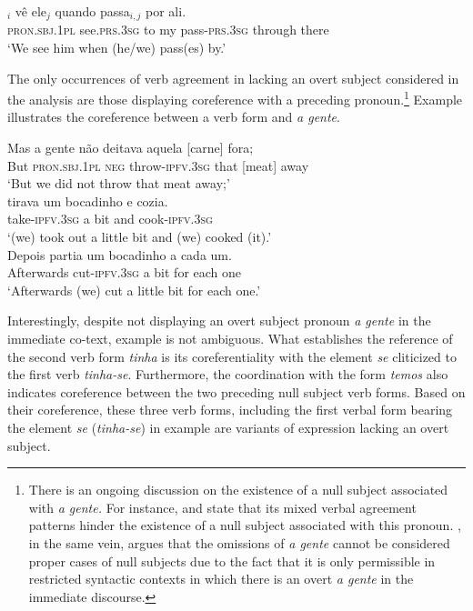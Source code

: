 \documentclass[output=paper]{langscibook}
\begin{document}
\ea \label{ex:henriques:10}
 $_i$ vê ele$_j$ quando passa$_{i,j}$ por ali. \\
         \textsc{pron.sbj.1pl} see.\textsc{prs.3sg} to my pass-\textsc{prs.3sg} through there\\
 \glt `We see him when (he/we) pass(es) by.'
\z 

The only occurrences of verb agreement in  lacking an overt subject considered in the analysis are those displaying coreference with a preceding  pronoun.\footnote{There is an ongoing discussion on the existence of a null subject associated with \textit{a gente.} For instance, \citet{Pereira2003} and \citet{MartinsNunes2021} state that its mixed verbal agreement patterns hinder the existence of a null subject associated with this pronoun. , in the same vein, argues that the omissions of \textit{a gente} cannot be considered proper cases of null subjects due to the fact that it is only permissible in restricted syntactic contexts in which there is an overt \textit{a gente} in the immediate discourse.} Example  illustrates the coreference between a  verb form and \textit{a gente}.

\ea\label{ex:henriques:11}
 \gll Mas {a gente} não deitava aquela [carne] fora;\\ 
         But \textsc{pron.sbj.1pl} \textsc{neg} throw-\textsc{ipfv.3sg} that [meat] away\\ 
 \glt `But we did not throw that meat away;'\\ 
 \gll tirava um bocadinho e cozia.\\
         take-\textsc{ipfv.3sg} a bit and cook-\textsc{ipfv.3sg}\\
 \glt `(we) took out a little bit and (we) cooked (it).'\\
 \gll    Depois     partia               um bocadinho a cada um. \\
         Afterwards cut-\textsc{ipfv.3sg} a bit     for each one\\
 \glt `Afterwards (we) cut a little bit for each one.'\\
\z

Interestingly, despite not displaying an overt subject pronoun \textit{a gente} in the immediate co-text, example  is not ambiguous. What establishes the  reference of the second verb form \textit{tinha} is its coreferentiality with the element \textit{se} cliticized to the first  verb \textit{tinha{}-se}. Furthermore, the coordination with the  form \textit{temos} also indicates coreference between the two preceding null subject verb forms. Based on their coreference, these three verb forms, including the first verbal form bearing the element \textit{se} (\textit{tinha-se}) in example  are variants of  expression lacking an overt subject.
\end{document}
